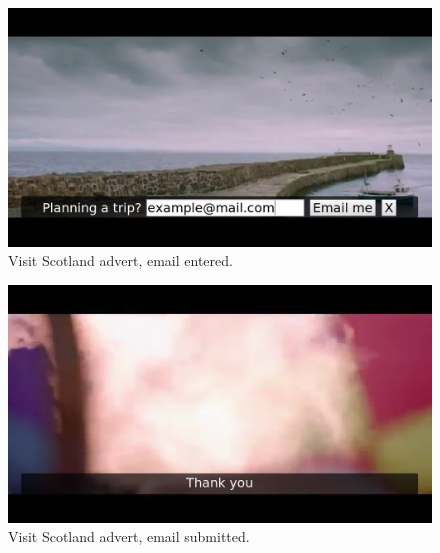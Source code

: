 	\begin{figure}[th]
		\centering
		\includegraphics[width=\textwidth,height=0.5\textheight,keepaspectratio]{images/adverts/visit_scotland-2.png}
		\caption{Visit Scotland advert, email entered.}
		\label{fig:visit_scotland2}
	\end{figure}

	\begin{figure}[th]
		\centering
		\includegraphics[width=\textwidth,height=0.5\textheight,keepaspectratio]{images/adverts/visit_scotland-3.png}
		\caption{Visit Scotland advert, email submitted.}
		\label{fig:visit_scotland3}
	\end{figure}
